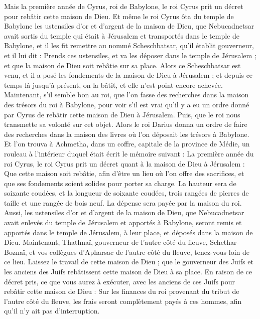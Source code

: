 \begin{multicols}{2}
Mais la première année de Cyrus, roi de Babylone, le roi Cyrus prit un décret pour rebâtir cette maison de Dieu.
Et même le roi Cyrus ôta du temple de Babylone les ustensiles d'or et d'argent de la maison de Dieu, que Nebucadnetsar avait sortis du temple qui était à Jérusalem et transportés dans le temple de Babylone, et il les fit remettre au nommé Scheschbatsar, qu’il établit gouverneur,
et il lui dit : Prends ces ustensiles, et va les déposer dans le temple de Jérusalem ; et que la maison de Dieu soit rebâtie sur sa place.
Alors ce Scheschbatsar est venu, et il a posé les fondements de la maison de Dieu à Jérusalem ; et depuis ce temps-là jusqu'à présent, on la bâtit, et elle n'est point encore achevée.
Maintenant, s'il semble bon au roi, que l’on fasse des recherches dans la maison des trésors du roi à Babylone, pour voir s'il est vrai qu'il y a eu un ordre donné par Cyrus de rebâtir cette  maison de Dieu à Jérusalem. Puis, que le roi nous transmette sa volonté sur cet objet.
\VerseOne{}Alors le roi Darius donna un ordre de faire des recherches dans la maison des livres où l'on déposait les  trésors à Babylone.
Et l’on trouva à Achmetha, dans un coffre, capitale de la province de Médie, un rouleau à l’intérieur duquel était écrit  le mémoire suivant :
La première année du roi Cyrus, le roi Cyrus prit un décret quant à la maison de Dieu à Jérusalem : Que cette maison soit rebâtie, afin d’être un lieu où l'on offre des sacrifices, et que ses fondements soient solides pour porter sa charge. La hauteur sera de soixante coudées, et la longueur de soixante coudées,
trois rangées de pierres de taille et une rangée de bois neuf.  La dépense sera payée par la maison du roi.
Aussi, les ustensiles d'or et d'argent de la maison de Dieu, que Nebucadnetsar avait enlevés du temple de Jérusalem et apportés à Babylone, seront remis et apportés dans le temple de Jérusalem, à leur place, et déposés dans la maison de Dieu.
Maintenant, Thathnaï, gouverneur de l'autre côté du fleuve, Schethar-Boznaï, et vos collègues d'Apharsac de l'autre côté du fleuve, tenez-vous loin de ce lieu.
Laissez le travail de cette maison de Dieu ; que le gouverneur des Juifs et les anciens des Juifs rebâtissent cette maison de Dieu à sa place.
En raison de ce décret pris, ce que vous aurez à exécuter, avec les anciens de ces Juifs pour rebâtir cette maison de Dieu : Sur les finances du roi provenant du tribut de l’autre côté du fleuve, les frais seront complètement payés à ces hommes, afin qu'il n'y ait pas d'interruption.

\end{multicols}
